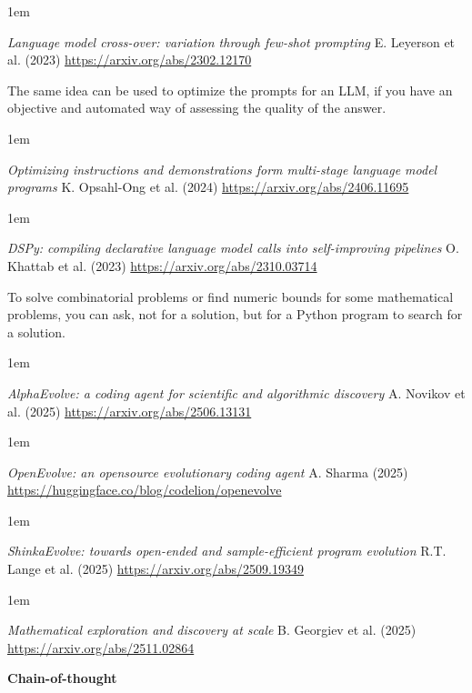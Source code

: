 \documentclass[a5paper]{article}
\newenvironment{reference}{%
  \medskip\goodbreak
  \parskip 0pt
  \raggedright
  \leftskip 1em
  \obeylines
}{\par\medskip\goodbreak}
\def\subsection#1{{\par\bigskip\goodbreak\large\bfseries #1\par}}
\begin{document}
\begin{reference}
  \emph{Language model cross-over:  variation through few-shot prompting}
  E. Leyerson et al. (2023)
  \url{https://arxiv.org/abs/2302.12170}
\end{reference}

The same idea can be used to optimize the prompts for an LLM,
if you have an objective and automated way of assessing the quality of the answer.

\begin{reference}
  \emph{Optimizing instructions and demonstrations form multi-stage language model programs}
  K. Opsahl-Ong et al. (2024)
  \url{https://arxiv.org/abs/2406.11695}
\end{reference}

\begin{reference}
  \emph{DSPy: compiling declarative language model calls into self-improving pipelines}
  O. Khattab et al. (2023)
  \url{https://arxiv.org/abs/2310.03714}
\end{reference}

To solve combinatorial problems or find numeric bounds for some mathematical problems,
you can ask, not for a solution, but for a Python program to search for a solution.

\begin{reference}
  \emph{AlphaEvolve: a coding agent  for scientific and algorithmic discovery}
  A. Novikov et al. (2025)
  \url{https://arxiv.org/abs/2506.13131}
\end{reference}

\begin{reference}
  \emph{OpenEvolve:  an opensource evolutionary coding agent}
  A. Sharma (2025)
  \url{https://huggingface.co/blog/codelion/openevolve}
\end{reference}

\begin{reference}
  \emph{ShinkaEvolve: towards open-ended  and sample-efficient program evolution}
  R.T. Lange et al. (2025)
  \url{https://arxiv.org/abs/2509.19349}
\end{reference}

\begin{reference}
  \emph{Mathematical exploration  and discovery at scale}
  B. Georgiev et al. (2025)
  \url{https://arxiv.org/abs/2511.02864}
\end{reference}

\subsection{Chain-of-thought}
\end{document}
